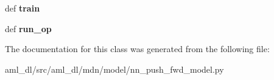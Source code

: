\begin{DoxyCompactItemize}
\item 
\hypertarget{classsrc_1_1aml__dl_1_1mdn_1_1model_1_1nn__push__fwd__model_1_1_n_n_push_fwd_model_a963312f51065b84cdaa12fb6fb71a1f8}{def {\bfseries train}}\label{classsrc_1_1aml__dl_1_1mdn_1_1model_1_1nn__push__fwd__model_1_1_n_n_push_fwd_model_a963312f51065b84cdaa12fb6fb71a1f8}

\item 
\hypertarget{classsrc_1_1aml__dl_1_1mdn_1_1model_1_1nn__push__fwd__model_1_1_n_n_push_fwd_model_ab003cc5a0d648c7382ad78623298c394}{def {\bfseries run\-\_\-op}}\label{classsrc_1_1aml__dl_1_1mdn_1_1model_1_1nn__push__fwd__model_1_1_n_n_push_fwd_model_ab003cc5a0d648c7382ad78623298c394}

\end{DoxyCompactItemize}


The documentation for this class was generated from the following file\-:\begin{DoxyCompactItemize}
\item 
aml\-\_\-dl/src/aml\-\_\-dl/mdn/model/nn\-\_\-push\-\_\-fwd\-\_\-model.\-py\end{DoxyCompactItemize}
